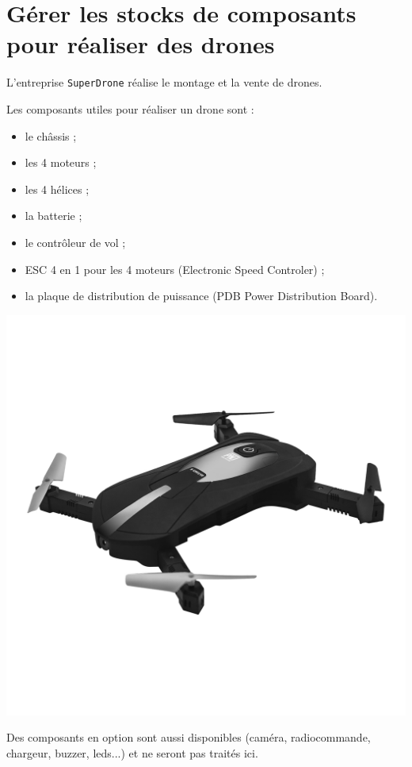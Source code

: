 
\section*{Gérer les stocks de composants pour réaliser des drones}
L'entreprise \lstinline{SuperDrone} réalise le montage et la vente de drones.


Les composants utiles pour réaliser un drone sont :
\begin{itemize}
\item le châssis ;
\item les 4 moteurs ;
\item les 4 hélices ;
\item la batterie ;
\item le contrôleur de vol ;
\item ESC 4 en 1 pour les 4 moteurs (Electronic Speed Controler) ;
\item la plaque de distribution de puissance (PDB Power Distribution Board).
\end{itemize}

\begin{marginfigure}
\includegraphics[width=\textwidth]{drone.jpg}
\end{marginfigure}

Des composants en option sont aussi disponibles (caméra, radiocommande, chargeur, buzzer, leds...) et ne seront pas traités ici.\\

